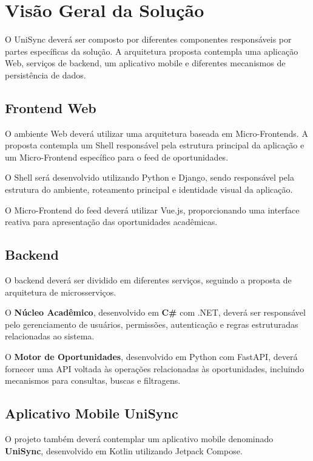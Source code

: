 \documentclass[12pt,oneside,a4paper,chapter=TITLE]{abntex2}
\begin{document}
\chapter{Visão Geral da Solução}

O UniSync deverá ser composto por diferentes componentes responsáveis
por partes específicas da solução. A arquitetura proposta contempla
uma aplicação Web, serviços de backend, um aplicativo mobile e
diferentes mecanismos de persistência de dados.

\section{Frontend Web}

O ambiente Web deverá utilizar uma arquitetura baseada em
Micro-Frontends. A proposta contempla um Shell responsável pela
estrutura principal da aplicação e um Micro-Frontend específico para
o feed de oportunidades.

O Shell será desenvolvido utilizando Python e Django, sendo responsável
pela estrutura do ambiente, roteamento principal e identidade visual
da aplicação.

O Micro-Frontend do feed deverá utilizar Vue.js, proporcionando uma
interface reativa para apresentação das oportunidades acadêmicas.

\section{Backend}

O backend deverá ser dividido em diferentes serviços, seguindo a
proposta de arquitetura de microsserviços.

O \textbf{Núcleo Acadêmico}, desenvolvido em \textbf{C\#} com .NET,
deverá ser responsável pelo gerenciamento de usuários, permissões,
autenticação e regras estruturadas relacionadas ao sistema.

O \textbf{Motor de Oportunidades}, desenvolvido em Python com FastAPI,
deverá fornecer uma API voltada às operações relacionadas às
oportunidades, incluindo mecanismos para consultas, buscas e
filtragens.

\section{Aplicativo Mobile UniSync}

O projeto também deverá contemplar um aplicativo mobile denominado
\textbf{UniSync}, desenvolvido em Kotlin utilizando Jetpack Compose.
\end{document}
